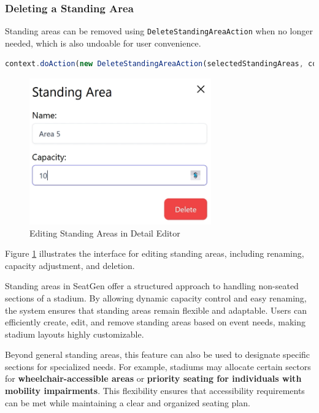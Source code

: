 \subsubsection{Deleting a Standing Area}
Standing areas can be removed using \texttt{DeleteStandingAreaAction} when no longer needed, which is also undoable for user convenience.

\begin{lstlisting}[language=TypeScript, caption=Deleting Standing Areas, label=lst:delete-standingarea]
context.doAction(new DeleteStandingAreaAction(selectedStandingAreas, context))

\end{lstlisting}

\begin{figure}[H]
    \centering
    \includegraphics[width=0.7\textwidth]{pics/DetailEditorStandingArea.png}
    \caption{Editing Standing Areas in Detail Editor}
    \label{fig:detail-editor-standingarea}
\end{figure}

Figure \ref{fig:detail-editor-standingarea} illustrates the interface for editing standing areas, including renaming, capacity adjustment, and deletion.

Standing areas in SeatGen offer a structured approach to handling non-seated sections of a stadium. By allowing dynamic capacity control and easy renaming, the system ensures that standing areas remain flexible and adaptable. Users can efficiently create, edit, and remove standing areas based on event needs, making stadium layouts highly customizable.

Beyond general standing areas, this feature can also be used to designate specific sections for specialized needs. For example, stadiums may allocate certain sectors for \textbf{wheelchair-accessible areas} or \textbf{priority seating for individuals with mobility impairments}. This flexibility ensures that accessibility requirements can be met while maintaining a clear and organized seating plan.

